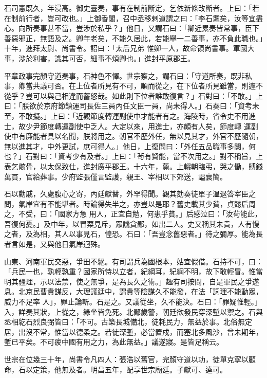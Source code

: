 \begin{pinyinscope}
 石司憲既久，年浸高。御史臺奏，事有在制前斷定，乞依新條改斷者。上曰：「若在制前行者，豈可改也。」上御香閣，召中丞移剌道謂之曰：「李石耄矣，汝等宜盡心。向所奏事甚不當，豈涉於私乎？」他日，又謂石曰：「卿近累奏皆常事，臣下善惡邪正，無語及之。卿年老矣，不能久居此，若能舉一二善事，亦不負此職也。」十年，進拜太尉、尚書令。詔曰：「太后兄弟
 惟卿一人，故命領尚書事。軍國大事，涉於利害，識其可否，細事不煩卿也。」進封平原郡王。



 平章政事完顏守道奏事，石神色不懌。世宗察之，謂石曰：「守道所奏，既非私事，卿當共議可否。在上位者所見有不可，順而從之，在下位者所見雖當，則遽不從乎？豈可以與己相違而蓄怒哉。如此則下位者誰敢復言？」石對曰：「不敢。」上曰：「朕欲於京府節鎮運司長佐三員內任文臣一員，尚未得人。」石奏曰：「資考未至，不敢擬。」上曰：「近觀節度轉運副使中才能者有之。海陵時，省令史不用進士，故少尹節度轉運副使中乏人。大定以來，用進士，亦頗有人矣，節度轉
 運副使中有廉能者具以名聞，朕將用之。朝官不歷外任，無以見其才，外官不歷隨朝，無以進其才，中外更試，庶可得人。」他日，上復問曰：「外任五品職事多闕，何也？」石對曰：「資考少有及者。」上曰：「茍有賢能，當不次用之。」對不稱旨，上表乞骸骨，以太保致仕，進封廣平郡王。十六年，薨。上輟朝臨弔，哭之慟，賻錢萬貫，官給葬事。少府監張僅言監護，親王、宰相以下郊送，謚襄簡。



 石以勳戚，久處腹心之寄，內廷獻替，外罕得聞。觀其劾奏徒單子溫退答宰臣之問，氣岸宜有不能堪者。時論得失半之，亦豈以是耶？舊史載其少貧，貞懿后周之，不受，曰：「國家方急
 用人，正宜自勉，何患乎貧。」后感泣曰：「汝茍能此，吾復何憂。」及中年，以冒粟見斥，眾譏貪鄙，如出二人。史又稱其未貴，人有慢之者，及為相，其人以事見石，惶恐。石曰：「吾豈念舊惡者。」待之彌厚。能為長者言如是，又與他日氣岸迥殊。



 山東、河南軍民交惡，爭田不絕。有司謂兵為國根本，姑宜假借。石持不可，曰：「兵民一也，孰輕孰重？國家所恃以立者，紀綱耳，紀綱不明，故下敢輕冒。惟當明其疆理，示以法禁，使之無爭，是為長久之術。」趣有司按問，自是軍民之爭遂息。北京民曹貴謀反，大理議廷中，謂貴等陰謀久不能發，在法「詞理不能動眾，威力不足率
 人」，罪止論斬。石是之。又議從坐，久不能決。石曰：「罪疑惟輕。」入，詳奏其狀，上從之，緣坐皆免死。北鄙歲警，朝廷欲發民穿深塹以禦之。石與丞相紇石烈良弼皆曰：「不可。古築長城備北，徒耗民力，無益於事。北俗無定居，出沒不常，惟當以德柔之。若徒深塹，必當置戍，而塞北多風沙，曾未期年，塹已平矣。不可疲中國有用之力，為此無益。」議遂寢。是皆足稱云。



 世宗在位幾三十年，尚書令凡四人：張浩以舊官，完顏守道以功，徒單克寧以顧命，石以定策，他無及者。明昌五年，配享世宗廟廷。子獻可、逵可。




\end{pinyinscope}

